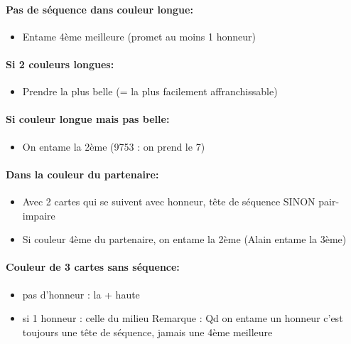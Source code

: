 \documentclass[a4paper]{article}
\begin{document}
\paragraph{Pas de séquence dans couleur longue:}

\begin{itemize}
\item Entame 4ème meilleure (promet au moins 1 honneur)

\end{itemize}

\paragraph{Si 2 couleurs longues:}

\begin{itemize}
\item Prendre la plus belle (= la plus facilement affranchissable)

\end{itemize}

\paragraph{Si couleur longue mais pas belle:}

\begin{itemize}
\item On entame la 2ème (9753 : on prend le 7)

\end{itemize}

\paragraph{Dans la couleur du partenaire:}

\begin{itemize}
\item Avec 2 cartes qui se suivent avec honneur, tête de séquence SINON pair-impaire

\item Si couleur 4ème du partenaire, on entame la 2ème (Alain entame la 3ème)

\end{itemize}

\paragraph{Couleur de 3 cartes sans séquence:}

\begin{itemize}
\item pas d’honneur : la + haute

\item si 1 honneur : celle du milieu
  Remarque : Qd on entame un honneur c’est toujours une tête de séquence, jamais une 4ème meilleure

\end{itemize}
\end{document}
